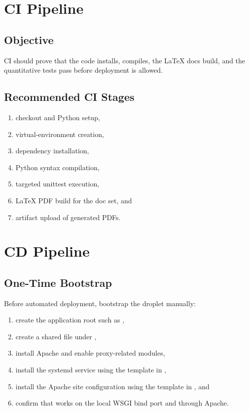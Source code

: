 \documentclass[conference]{IEEEtran}
\begin{document}
\section{CI Pipeline}
\subsection{Objective}
CI should prove that the code installs, compiles, the LaTeX docs build, and the quantitative tests pass before deployment is allowed.

\subsection{Recommended CI Stages}
\begin{enumerate}[leftmargin=1.5em]
    \item checkout and Python setup,
    \item virtual-environment creation,
    \item dependency installation,
    \item Python syntax compilation,
    \item targeted unittest execution,
    \item LaTeX PDF build for the doc set, and
    \item artifact upload of generated PDFs.
\end{enumerate}

\section{CD Pipeline}
\subsection{One-Time Bootstrap}
Before automated deployment, bootstrap the droplet manually:
\begin{enumerate}[leftmargin=1.5em]
    \item create the application root such as ,
    \item create a shared  file under ,
    \item install Apache and enable proxy-related modules,
    \item install the systemd service using the template in ,
    \item install the Apache site configuration using the template in , and
    \item confirm that  works on the local WSGI bind port and through Apache.
\end{enumerate}
\end{document}
